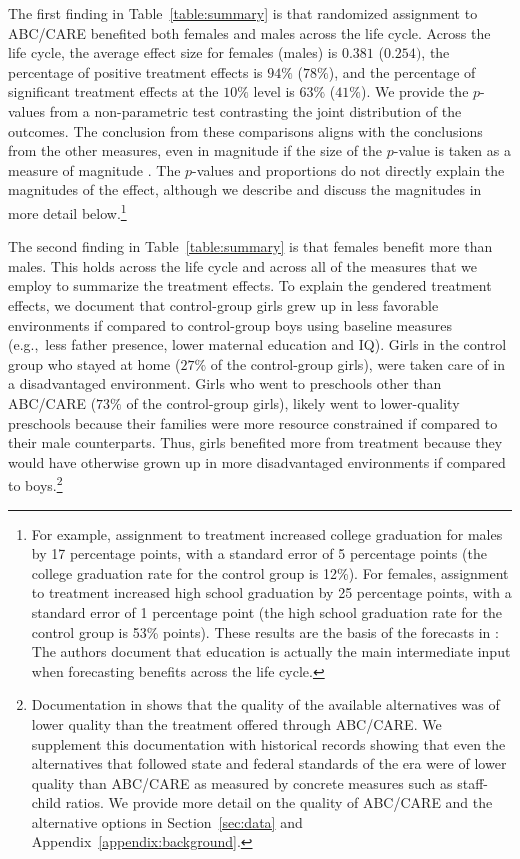 The first finding in Table~\ref{table:summary} is that randomized assignment to ABC/CARE benefited both females and males across the life cycle. Across the life cycle, the average effect size for females (males) is $0.381$ ($0.254)$, the percentage of positive treatment effects is $94\%$ ($78\%$), and the percentage of significant treatment effects at the $10\%$ level is $63\%$ ($41\%$). We provide the $p$-values from a non-parametric test contrasting the joint distribution of the outcomes. The conclusion from these comparisons aligns with the conclusions from the other measures, even in magnitude if the size of the $p$-value is taken as a measure of magnitude \citep{Fisher_1935_Inference_JRSS}. The $p$-values and proportions do not directly explain the magnitudes of the effect, although we describe and discuss the magnitudes in more detail below.\footnote{For example, assignment to treatment increased college graduation for males by 17 percentage points, with a standard error of 5 percentage points (the college graduation rate for the control group is 12\%). For females, assignment to treatment increased high school graduation by 25 percentage points, with a standard error of 1 percentage point (the high school graduation rate for the control group is 53\% points). These results are the basis of the forecasts in \citet{Garcia_Heckman_Leaf_etal_2017_Comp_CBA_Unpublished}: The authors document that education is actually the main intermediate input when forecasting benefits across the life cycle.}

The second finding in Table~\ref{table:summary} is that females benefit more than males. This holds across the life cycle and across all of the measures that we employ to summarize the treatment effects. To explain the gendered treatment effects, we document that control-group girls grew up in less favorable environments if compared to control-group boys using baseline measures (e.g.,\ less father presence, lower maternal education and IQ). Girls in the control group who stayed at home ($27\%$ of the control-group girls), were taken care of in a disadvantaged environment. Girls who went to preschools other than ABC/CARE ($73\%$ of the control-group girls), likely went to lower-quality preschools because their families were more resource constrained if compared to their male counterparts. Thus, girls benefited more from treatment because they would have otherwise grown up in more disadvantaged environments if compared to boys.\footnote{Documentation in \citet{Burchinal_etal_1989_CD_Daycare-Pre-K-Dev} shows that the quality of the available alternatives was of lower quality than the treatment offered through ABC/CARE. We supplement this documentation with historical records showing that even the alternatives that followed state and federal standards of the era were of lower quality than ABC/CARE as measured by concrete measures such as staff-child ratios. We provide more detail on the quality of ABC/CARE and the alternative options in Section~\ref{sec:data} and Appendix~\ref{appendix:background}.}

